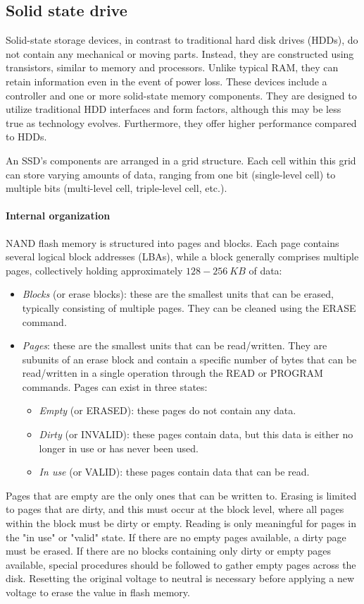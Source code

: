 \subsection{Solid state drive}
Solid-state storage devices, in contrast to traditional hard disk drives (HDDs), do not contain any mechanical or moving parts. 
Instead, they are constructed using transistors, similar to memory and processors. 
Unlike typical RAM, they can retain information even in the event of power loss.
These devices include a controller and one or more solid-state memory components. 
They are designed to utilize traditional HDD interfaces and form factors, although this may be less true as technology evolves. 
Furthermore, they offer higher performance compared to HDDs.

An SSD's components are arranged in a grid structure. 
Each cell within this grid can store varying amounts of data, ranging from one bit (single-level cell) to multiple bits (multi-level cell, triple-level cell, etc.).

\paragraph*{Internal organization}
NAND flash memory is structured into pages and blocks. 
Each page contains several logical block addresses (LBAs), while a block generally comprises multiple pages, collectively holding approximately $128-256\:KB$ of data: 
\begin{itemize}
    \item \textit{Blocks} (or erase blocks): these are the smallest units that can be erased, typically consisting of multiple pages. 
        They can be cleaned using the ERASE command.
    \item \textit{Pages}: these are the smallest units that can be read/written. 
        They are subunits of an erase block and contain a specific number of bytes that can be read/written in a single operation through the READ or PROGRAM commands. 
        Pages can exist in three states:
        \begin{itemize}
            \item \textit{Empty} (or ERASED): these pages do not contain any data.
            \item \textit{Dirty} (or INVALID): these pages contain data, but this data is either no longer in use or has never been used.
            \item \textit{In use} (or VALID): these pages contain data that can be read.
        \end{itemize}
\end{itemize}
Pages that are empty are the only ones that can be written to. 
Erasing is limited to pages that are dirty, and this must occur at the block level, where all pages within the block must be dirty or empty. 
Reading is only meaningful for pages in the "in use" or "valid" state. If there are no empty pages available, a dirty page must be erased. 
If there are no blocks containing only dirty or empty pages available, special procedures should be followed to gather empty pages across the disk.
Resetting the original voltage to neutral is necessary before applying a new voltage to erase the value in flash memory. 

